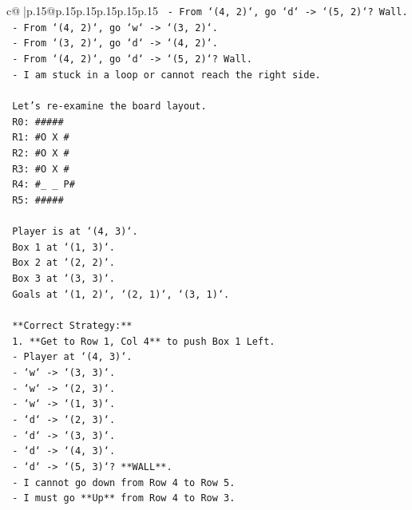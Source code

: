 \documentclass{article}
\begin{document}
{\begin{supertabular}{c@{$\;$}|p{.15\linewidth}@{}p{.15\linewidth}p{.15\linewidth}p{.15\linewidth}p{.15\linewidth}p{.15\linewidth}}
{{{\texttt{    {-} From `(4, 2)`, go `d` {-}> `(5, 2)`? Wall.} \\
\texttt{    {-} From `(4, 2)`, go `w` {-}> `(3, 2)`.} \\
\texttt{    {-} From `(3, 2)`, go `d` {-}> `(4, 2)`.} \\
\texttt{    {-} From `(4, 2)`, go `d` {-}> `(5, 2)`? Wall.} \\
\texttt{    {-} I am stuck in a loop or cannot reach the right side.} \\
\\ 
\texttt{    Let's re{-}examine the board layout.} \\
\texttt{    R0: \#\#\#\#\#} \\
\texttt{    R1: \#O X \#} \\
\texttt{    R2: \#O X \#} \\
\texttt{    R3: \#O X \#} \\
\texttt{    R4: \#\_ \_ P\#} \\
\texttt{    R5: \#\#\#\#\#} \\
\\ 
\texttt{    Player is at `(4, 3)`.} \\
\texttt{    Box 1 at `(1, 3)`.} \\
\texttt{    Box 2 at `(2, 2)`.} \\
\texttt{    Box 3 at `(3, 3)`.} \\
\texttt{    Goals at `(1, 2)`, `(2, 1)`, `(3, 1)`.} \\
\\ 
\texttt{    **Correct Strategy:**} \\
\texttt{    1.  **Get to Row 1, Col 4** to push Box 1 Left.} \\
\texttt{        {-} Player at `(4, 3)`.} \\
\texttt{        {-} `w` {-}> `(3, 3)`.} \\
\texttt{        {-} `w` {-}> `(2, 3)`.} \\
\texttt{        {-} `w` {-}> `(1, 3)`.} \\
\texttt{        {-} `d` {-}> `(2, 3)`.} \\
\texttt{        {-} `d` {-}> `(3, 3)`.} \\
\texttt{        {-} `d` {-}> `(4, 3)`.} \\
\texttt{        {-} `d` {-}> `(5, 3)`? **WALL**.} \\
\texttt{        {-} I cannot go down from Row 4 to Row 5.} \\
\texttt{        {-} I must go **Up** from Row 4 to Row 3.} \\
}}}
\end{supertabular}}
\end{document}
